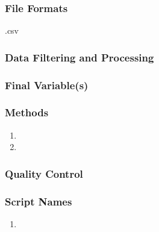 \subsubsection*{File Formats}
.csv

\subsubsection*{Data Filtering and Processing}

\subsubsection*{Final Variable(s)}

\subsubsection*{Methods}

\begin{enumerate}[nolistsep]
\item
\item
\end{enumerate}

\subsubsection*{Quality Control}

\subsubsection*{Script Names}

\begin{enumerate}[nolistsep]
\item
\end{enumerate}


